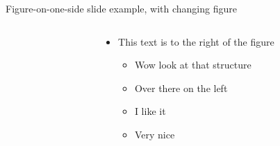 \documentclass{beamer}
\begin{document}
\begin{frame}{Figure-on-one-side slide example, with changing figure}
  \begin{columns}
    \begin{column}{0.5\textwidth}
      \centering
    \end{column}
    \begin{column}{0.5\textwidth}
      \begin{itemize}
      \setlength{\itemsep}{1em}
        \item This text is to the right of the figure 
        \begin{itemize}
          \item Wow look at that structure  
          \item Over there on the left
          \item I like it 
          \item Very nice 
        \end{itemize}
      \end{itemize}
    \end{column}
  \end{columns}
\end{frame}
\end{document}
